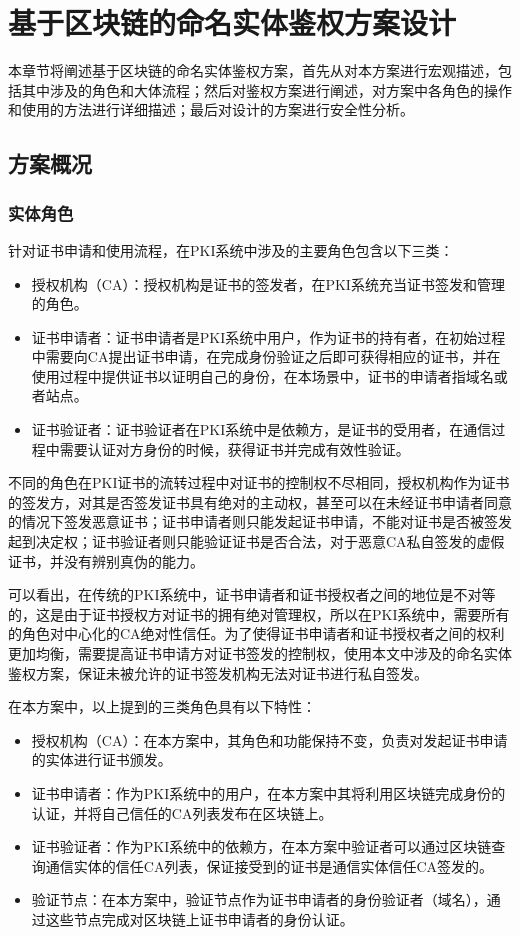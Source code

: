 
\chapter{基于区块链的命名实体鉴权方案设计}

本章节将阐述基于区块链的命名实体鉴权方案，首先从对本方案进行宏观描述，包括其中涉及的角色和大体流程；然后对鉴权方案进行阐述，对方案中各角色的操作和使用的方法进行详细描述；最后对设计的方案进行安全性分析。

\section{方案概况}

\subsection{实体角色}

针对证书申请和使用流程，在PKI系统中涉及的主要角色包含以下三类：
\begin{itemize}
	\item 授权机构（CA）：授权机构是证书的签发者，在PKI系统充当证书签发和管理的角色。
	\item 证书申请者：证书申请者是PKI系统中用户，作为证书的持有者，在初始过程中需要向CA提出证书申请，在完成身份验证之后即可获得相应的证书，并在使用过程中提供证书以证明自己的身份，在本场景中，证书的申请者指域名或者站点。
	\item 证书验证者：证书验证者在PKI系统中是依赖方，是证书的受用者，在通信过程中需要认证对方身份的时候，获得证书并完成有效性验证。
\end{itemize}

不同的角色在PKI证书的流转过程中对证书的控制权不尽相同，授权机构作为证书的签发方，对其是否签发证书具有绝对的主动权，甚至可以在未经证书申请者同意的情况下签发恶意证书；证书申请者则只能发起证书申请，不能对证书是否被签发起到决定权；证书验证者则只能验证证书是否合法，对于恶意CA私自签发的虚假证书，并没有辨别真伪的能力。

可以看出，在传统的PKI系统中，证书申请者和证书授权者之间的地位是不对等的，这是由于证书授权方对证书的拥有绝对管理权，所以在PKI系统中，需要所有的角色对中心化的CA绝对性信任。为了使得证书申请者和证书授权者之间的权利更加均衡，需要提高证书申请方对证书签发的控制权，使用本文中涉及的命名实体鉴权方案，保证未被允许的证书签发机构无法对证书进行私自签发。

在本方案中，以上提到的三类角色具有以下特性：
\begin{itemize}
	\item 授权机构（CA）：在本方案中，其角色和功能保持不变，负责对发起证书申请的实体进行证书颁发。
	\item 证书申请者：作为PKI系统中的用户，在本方案中其将利用区块链完成身份的认证，并将自己信任的CA列表发布在区块链上。
	\item 证书验证者：作为PKI系统中的依赖方，在本方案中验证者可以通过区块链查询通信实体的信任CA列表，保证接受到的证书是通信实体信任CA签发的。
	\item 验证节点：在本方案中，验证节点作为证书申请者的身份验证者（域名），通过这些节点完成对区块链上证书申请者的身份认证。
\end{itemize}

